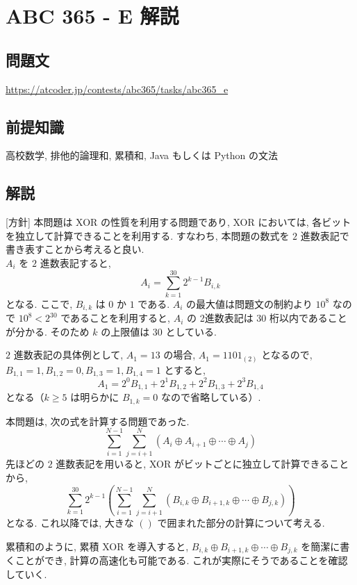 \chapter*{ABC 365 - E 解説}
    \section*{問題文}
    \url{https://atcoder.jp/contests/abc365/tasks/abc365_e}

    \section*{前提知識}
    高校数学, 排他的論理和, 累積和, Java もしくは Python の文法

    \section*{解説}
    [方針] 本問題は XOR の性質を利用する問題であり, XOR においては, 各ビットを独立して計算できることを利用する.
    すなわち, 本問題の数式を $2$ 進数表記で書き表すことから考えると良い.\\

    $A_i$ を $2$ 進数表記すると,
    $$ A_i = \sum_{k=1}^{30} 2^{k - 1} B_{i, k} $$
    となる.
    ここで, $B_{i, k}$ は $0$ か $1$ である.
    $A_i$ の最大値は問題文の制約より $10^8$ なので $10^8 < 2^{30}$ であることを利用すると, $A_i$ の 2進数表記は $30$ 桁以内であることが分かる.
    そのため $k$ の上限値は $30$ としている.

    $2$ 進数表記の具体例として, $A_1 = 13$ の場合, $A_1 = 1101_{(2)}$ となるので, $B_{1, 1} = 1, B_{1, 2} = 0, B_{1, 3} = 1, B_{1, 4} = 1$ とすると,
    $$A_1 = 2^0 B_{1, 1} + 2^1 B_{1, 2} + 2^2 B_{1, 3} + 2^3 B_{1, 4}$$
    となる（$k \ge 5$ は明らかに $B_{1, k} = 0$ なので省略している）.

    本問題は, 次の式を計算する問題であった.
    $$\sum_{i = 1}^{N - 1}\sum_{j = i + 1}^N (A_i \oplus A_{i + 1} \oplus \cdots \oplus A_j)$$
    先ほどの $2$ 進数表記を用いると, XOR がビットごとに独立して計算できることから,
    $$\sum_{k = 1}^{30} 2^{k - 1} \left(\sum_{i = 1}^{N - 1}\sum_{j = i + 1}^N (B_{i, k} \oplus B_{i + 1, k} \oplus \cdots \oplus B_{j, k})\right)$$
    となる.
    これ以降では, 大きな $\left(\right)$ で囲まれた部分の計算について考える.

    累積和のように, 累積 XOR を導入すると, $B_{i, k} \oplus B_{i + 1, k} \oplus \cdots \oplus B_{j, k}$ を簡潔に書くことができ, 計算の高速化も可能である.
    これが実際にそうであることを確認していく.

